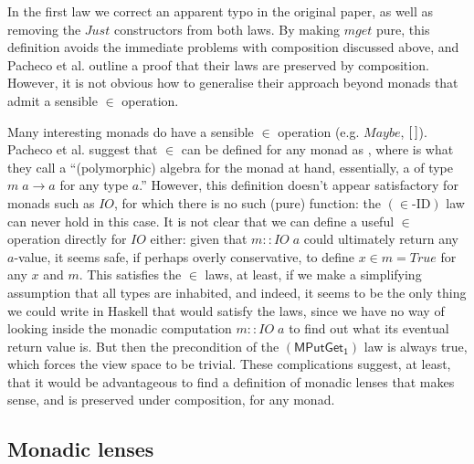 \documentclass[runningheads]{llncs}
\newcommand{\Conid}[1]{\mathit{#1}}
\newcommand{\Varid}[1]{\mathit{#1}}
\begin{document}
In the first law we correct an apparent typo in the original paper,
as well as removing the \ensuremath{\Conid{Just}} constructors from both laws.  By making \ensuremath{\Varid{mget}}
pure, this definition avoids the immediate problems with composition
discussed above, and Pacheco et al. outline a proof that their laws
are preserved by composition.  However, it is not obvious how to
generalise their approach beyond monads that admit a sensible \ensuremath{\in}
operation.

Many interesting monads do have a sensible \ensuremath{\in} operation
(e.g. \ensuremath{\Conid{Maybe}}, \ensuremath{[\mskip1.5mu \mskip1.5mu]}).  Pacheco et al. suggest that \ensuremath{\in} can be
defined for any monad as , where
 is what they call a ``(polymorphic) algebra for the monad at hand,
essentially, a
 of type \ensuremath{\Varid{m}\;\Varid{a}\to \Varid{a}} for any type \ensuremath{\Varid{a}}.''
However, this
definition doesn't appear satisfactory for monads such as \ensuremath{\Conid{IO}}, for
which there is no such (pure) function: the \ensuremath{({\in}\text{-ID})} law can
never hold in this case.  It is not clear that we can define a useful
\ensuremath{\in} operation directly for \ensuremath{\Conid{IO}} either: given that \ensuremath{\Varid{m}\mathbin{::}\Conid{IO}\;\Varid{a}}
could ultimately return any \ensuremath{\Varid{a}}-value, 
it seems safe, if perhaps
overly conservative, to define \ensuremath{\Varid{x}\in\Varid{m}\mathrel{=}\Conid{True}} for any \ensuremath{\Varid{x}} and
\ensuremath{\Varid{m}}. This satisfies the \ensuremath{\in} laws, at least, if we make a
simplifying assumption that all types are inhabited, and indeed, it
seems to be the only thing we could write in Haskell that would
satisfy the laws, since we have no way of looking inside the monadic
computation \ensuremath{\Varid{m}\mathbin{::}\Conid{IO}\;\Varid{a}} to find out what its eventual return value
is. But then the precondition of the \ensuremath{\mathsf{(MPutGet_1)}} law is always true, which
forces the view space to be trivial.  These complications suggest, at
least, that it would be advantageous to find a definition of monadic
lenses that makes sense, and is preserved under composition, for any
monad.




\subsection{Monadic lenses}
\end{document}

